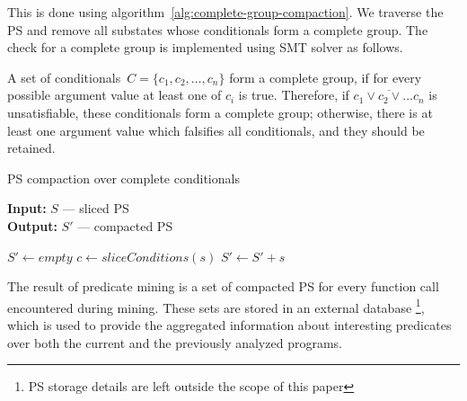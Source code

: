 This is done using algorithm~\ref{alg:complete-group-compaction}. We traverse the PS and remove all substates whose conditionals form a complete group. The check for a complete group is implemented using SMT solver as follows.

A set of conditionals~$C = \{c_1, c_2, \ldots, c_n\}$ form a complete group, if for every possible argument value at least one of $c_i$ is true. Therefore, if $\overline{ c_1 \lor c_2 \lor \ldots c_n }$ is unsatisfiable, these conditionals form a complete group; otherwise, there is at least one argument value which falsifies all conditionals, and they should be retained.

\begin{algorithm}[tbh]
\caption{PS compaction over complete conditionals}
\label{alg:complete-group-compaction}

\textbf{Input:}  $S$  --- sliced PS\\
\textbf{Output:} $S'$ --- compacted PS

\begin{algorithmic}
\State $S' \leftarrow empty$
    \State $c \leftarrow sliceConditions(s)$
        \State $S' \leftarrow S' + s$
    \EndIf
\EndFor
\end{algorithmic}
\end{algorithm}

The result of predicate mining is a set of compacted PS for every function call encountered during mining. These sets are stored in an external database%
\footnote{PS storage details are left outside the scope of this paper},
which is used to provide the aggregated information about interesting predicates over both the current and the previously analyzed programs.
